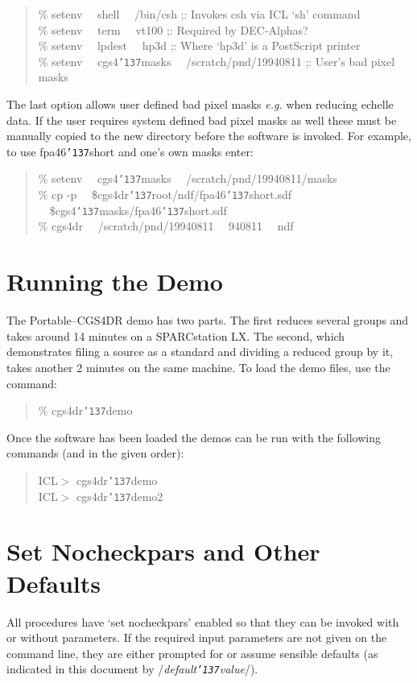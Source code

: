 \documentclass[a4paper]{book}
\renewcommand{\_}{{\tt\char'137}}
\begin{document}
\begin{quote}
 \% setenv \ \ {\sc shell} \ \ /bin/csh \hfill ;: Invokes csh via ICL `sh' command \\
 \% setenv \ \ {\sc term} \ \ vt100     \hfill ;: Required by DEC-Alphas? \\
 \% setenv \ \ {\sc lpdest} \ \ hp3d    \hfill ;: Where `hp3d' is a PostScript printer \\
 \% setenv \ \ {\sc cgs4\_masks} \ \ /scratch/pnd/19940811 \hfill ;: User's bad pixel masks
\end{quote}

The last option allows user defined bad pixel masks {\em e.g.} 
when reducing echelle data. If the user requires system defined bad pixel 
masks as well these must be manually copied to the new directory before the 
software is invoked. For example, to use fpa46\_short and one's own masks 
enter:

\begin{quote}
 \% setenv \ \ {\sc cgs4\_masks} \ \ /scratch/pnd/19940811/masks \\
 \% cp -p \ \ {\sc \${cgs4dr\_root}}/ndf/fpa46\_short.sdf \ \ {\sc \${cgs4\_masks}}/fpa46\_short.sdf \\
 \% cgs4dr \ \ /scratch/pnd/19940811 \ \ 940811 \ \ ndf 
\end{quote}

\section{Running the Demo}
The Portable--CGS4DR demo has two parts. The first reduces several groups
and takes around 14 minutes on a SPARCstation LX. The second, which
demonstrates filing a source as a standard and dividing a reduced group by
it, takes another 2 minutes on the same machine. To load the demo files,
use the command: 

\begin{quote}
  \% cgs4dr\_demo
\end{quote}

Once the software has been loaded the demos can be run with the following
commands (and in the given order): 

\begin{quote}
  ICL$>$ cgs4dr\_demo \\
  ICL$>$ cgs4dr\_demo2
\end{quote}

\section{Set Nocheckpars and Other Defaults}
All procedures have `set nocheckpars' enabled so that they can be invoked
with or without parameters. If the required input parameters are not given
on the command line, they are either prompted for or assume sensible
defaults (as indicated in this document by /{\em default\_value}/). 
\end{document}
